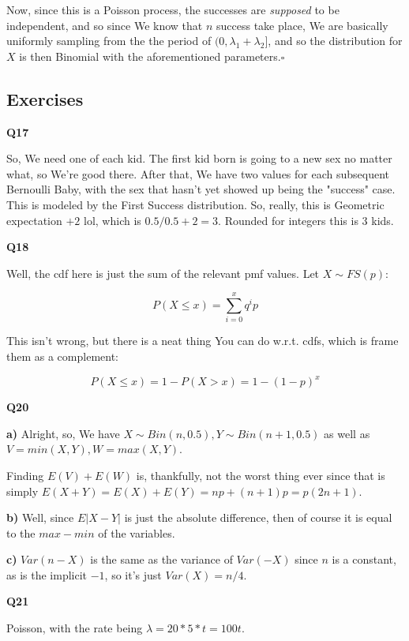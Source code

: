 \documentclass{article}
\newcommand{\qed}{\hfill$\square$}
\begin{document}
		Now, since this is a Poisson process, the successes are \textit{supposed} to be independent, and so since We know that $n$ success take place, We are basically uniformly sampling from the the period of $(0, \lambda_1+\lambda_2]$, and so the distribution for $X$ is then Binomial with the aforementioned parameters.\qed
		
	\subsection{Exercises}
	
		\textbf{Q17}
		
		So, We need one of each kid. The first kid born is going to a new sex no matter what, so We're good there. After that, We have two values for each subsequent Bernoulli Baby, with the sex that hasn't yet showed up being the "success" case. This is modeled by the First Success distribution. So, really, this is Geometric expectation $+2$ lol, which is $0.5/0.5 + 2 = 3$. Rounded for integers this is $3$ kids.
		
		\hfill

		\textbf{Q18}
		
		Well, the cdf here is just the sum of the relevant pmf values. Let $X\sim FS(p)$:
		
		\[ P(X \le x) =  \sum^x_{i=0} q^ip \]
		
		This isn't wrong, but there is a neat thing You can do w.r.t. cdfs, which is frame them as a complement:
		
		\[ P(X \le x) = 1 - P(X > x) = 1 - (1-p)^{x} \]

		\hfill
		
		\textbf{Q20}
		
		\textbf{a)} Alright, so, We have $X\sim Bin(n, 0.5), Y\sim Bin(n+1, 0.5)$ as well as  $V = min(X, Y), W = max(X, Y)$.
		
		Finding $E(V) + E(W)$ is, thankfully, not the worst thing ever since that is simply $E(X+Y) = E(X) + E(Y) = np + (n+1)p = p(2n+1)$.
		
		\textbf{b)} Well, since $E\vert X - Y\vert$ is just the absolute difference, then of course it is equal to the $max - min$ of the variables.
		
		\textbf{c)} $Var(n - X)$ is the same as the variance of $Var(-X)$ since $n$ is a constant, as is the implicit $-1$, so it's just $Var(X) = n/4$.
		
		\hfill
		
		\textbf{Q21}
		
		Poisson, with the rate being $\lambda = 20*5*t = 100t$.
		
\end{document}
